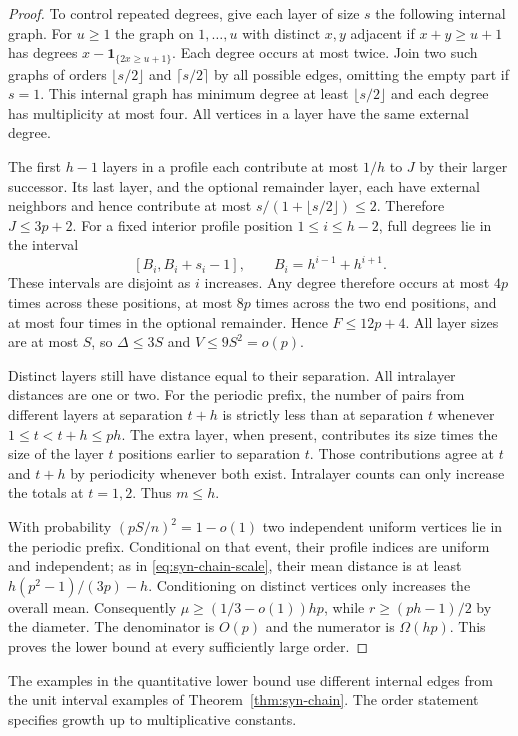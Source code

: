 \documentclass[11pt,a4paper]{article}
\theoremstyle{remark}\newtheorem*{remark}{Remark}
\begin{document}
\begin{proof}
To control repeated degrees, give each layer of size $s$ the following
internal graph. For $u\ge1$ the graph on $1,\ldots,u$ with distinct
$x,y$ adjacent if $x+y\ge u+1$ has degrees
$x-\mathbf1_{\{2x\ge u+1\}}$. Each degree occurs at most twice. Join
two such graphs of orders $\lfloor s/2\rfloor$ and $\lceil s/2\rceil$
by all possible edges, omitting the empty part if $s=1$. This internal
graph has minimum degree at least $\lfloor s/2\rfloor$ and each degree
has multiplicity at most four. All vertices in a layer have the same
external degree.

The first $h-1$ layers in a profile each contribute at most $1/h$ to
$J$ by their larger successor. Its last layer, and the optional
remainder layer, each have external neighbors and hence contribute at
most $s/(1+\lfloor s/2\rfloor)\le2$. Therefore $J\le3p+2$.
For a fixed interior profile position $1\le i\le h-2$, full degrees
lie in the interval
\[
 [B_i,B_i+s_i-1],\qquad B_i=h^{i-1}+h^{i+1}.
\]
These intervals are disjoint as $i$ increases. Any degree therefore
occurs at most $4p$ times across these positions, at most $8p$ times
across the two end positions, and at most four times in the optional
remainder. Hence $F\le12p+4$. All layer sizes are at most $S$, so
$\Delta\le3S$ and $V\le9S^2=o(p)$.

Distinct layers still have distance equal to their separation. All
intralayer distances are one or two. For the periodic prefix, the
number of pairs from different layers at separation $t+h$ is strictly
less than at separation $t$ whenever $1\le t<t+h\le ph$. The extra
layer, when present, contributes its size times the size of the layer
$t$ positions earlier to separation $t$. Those contributions agree
at $t$ and $t+h$ by periodicity whenever both exist. Intralayer counts
can only increase the totals at $t=1,2$. Thus $m\le h$.

With probability $(pS/n)^2=1-o(1)$ two independent uniform vertices
lie in the periodic prefix. Conditional on that event, their profile
indices are uniform and independent; as in \eqref{eq:syn-chain-scale},
their mean distance is at least $h(p^2-1)/(3p)-h$. Conditioning on
distinct vertices only increases the overall mean. Consequently
$\mu\ge(1/3-o(1))hp$, while $r\ge(ph-1)/2$ by the diameter. The
denominator is $O(p)$ and the numerator is $\Omega(hp)$. This proves
the lower bound at every sufficiently large order.
\end{proof}
The examples in the quantitative lower bound use different internal
edges from the unit interval examples of Theorem~\ref{thm:syn-chain}.
The order statement specifies growth up to multiplicative constants.
\end{document}
